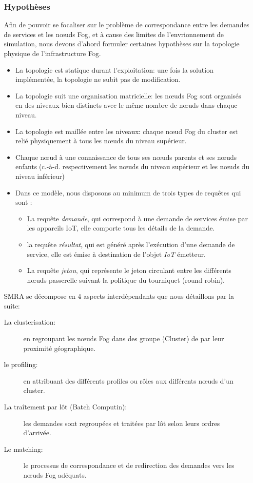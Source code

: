 \subsubsection{Hypothèses}
Afin de pouvoir se focaliser sur le problème de correspondance entre les demandes de services et les nœuds Fog, et à cause des limites de l'envrionnement de simulation, nous devons d'abord formuler certaines hypothèses sur la topologie physique de l'infrastructure Fog.\\
\begin{itemize}
    \item La topologie est statique durant l'exploitation: une fois la solution implémentée, la topologie ne subit pas de modification.
    \item La topologie suit une organisation matricielle: les nœuds Fog sont organisés en des niveaux bien distincts avec le même nombre de nœuds dans chaque niveau.
    \item La topologie est maillée entre les niveaux: chaque nœud Fog du cluster est relié physiquement à tous les nœuds du niveau supérieur.
    \item Chaque nœud à une connaissance de tous ses nœuds parents et ses nœuds enfants (c.-à-d. respectivement les nœuds du niveau supérieur et les nœuds du niveau inférieur)
    \item Dans ce modèle, nous disposons au minimum de trois types de requêtes qui sont : \\
          \begin{itemize}
             \item La requête \emph{demande}, qui correspond à une demande de services émise par les appareils IoT, elle comporte tous les détails de la demande.
             \item la requête \emph{résultat}, qui est généré après l'exécution d'une demande de service, elle est émise à destination de l'objet \emph{IoT} émetteur.
             \item La requête \emph{jeton}, qui représente le jeton circulant entre les différents nœuds passerelle suivant la politique du tourniquet (round-robin).
          \end{itemize}
\end{itemize}

SMRA se décompose en 4 aspects interdépendants que nous détaillons par la suite: 
\begin{description}
  \item[La clusterisation:] en regroupant les nœuds Fog dans des groupe (Cluster) de par leur proximité géographique.
  \item[le profiling:] en attribuant des différents profiles ou rôles aux différents nœuds d'un cluster.
  \item[La traîtement par lôt (Batch Computin):] les demandes sont regroupées et traitées par lôt selon leurs ordres d'arrivée.
  \item[Le matching:] le processus de correspondance et de redirection des demandes vers les nœuds Fog adéquats.
\end{description}

